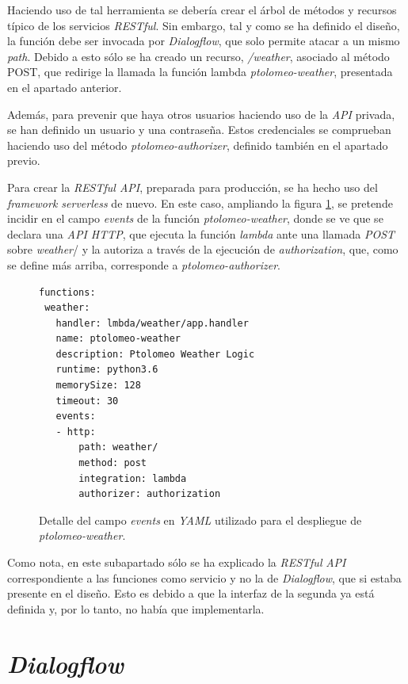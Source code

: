 \documentclass[11pt,spanish,listoffigures]{tfgetsinf}
\begin{document}
Haciendo uso de tal herramienta se debería crear el árbol de métodos y recursos típico de los servicios \textit{RESTful}. Sin embargo, tal y como se ha definido el diseño, la función debe ser invocada por \textit{Dialogflow}, que solo permite atacar a un mismo \textit{path}. Debido a esto sólo se ha creado un recurso, \textit{/weather}, asociado al método POST, que redirige la llamada la función lambda \textit{ptolomeo-weather}, presentada en el apartado anterior.

Además, para prevenir que haya otros usuarios haciendo uso de la \textit{API} privada, se han definido un usuario y una contraseña. Estos credenciales se comprueban haciendo uso del método \textit{ptolomeo-authorizer}, definido también en el apartado previo.

Para crear la \textit{RESTful API}, preparada para producción, se ha hecho uso del \textit{framework serverless} de nuevo. En este caso, ampliando la figura \ref{fig:yaml2}, se pretende incidir en el campo \textit{events} de la función \textit{ptolomeo-weather}, donde se ve que se declara una \textit{API HTTP}, que ejecuta la función \textit{lambda} ante una llamada \textit{POST} sobre \textit{weather}/ y la autoriza a través de la ejecución de \textit{authorization}, que, como se define más arriba, corresponde a \textit{ptolomeo-authorizer}.

\begin{figure}[h!]
    \centering
    \begin{lstlisting}
functions:
 weather:
   handler: lmbda/weather/app.handler
   name: ptolomeo-weather
   description: Ptolomeo Weather Logic
   runtime: python3.6
   memorySize: 128
   timeout: 30
   events:
   - http:
       path: weather/
       method: post
       integration: lambda
       authorizer: authorization
    \end{lstlisting}
    \caption{Detalle del campo \textit{events} en \textit{YAML} utilizado para el despliegue de \textit{ptolomeo-weather}.}
    \label{fig:yaml2}
\end{figure}

Como nota, en este subapartado sólo se ha explicado la \textit{RESTful} \textit{API} correspondiente a las funciones como servicio y no la de \textit{Dialogflow}, que si estaba presente en el diseño. Esto es debido a que la interfaz de la segunda ya está definida y, por lo tanto, no había que implementarla. 

\section{\textit{Dialogflow}}
\label{sec:development-dialogflow}
\end{document}
